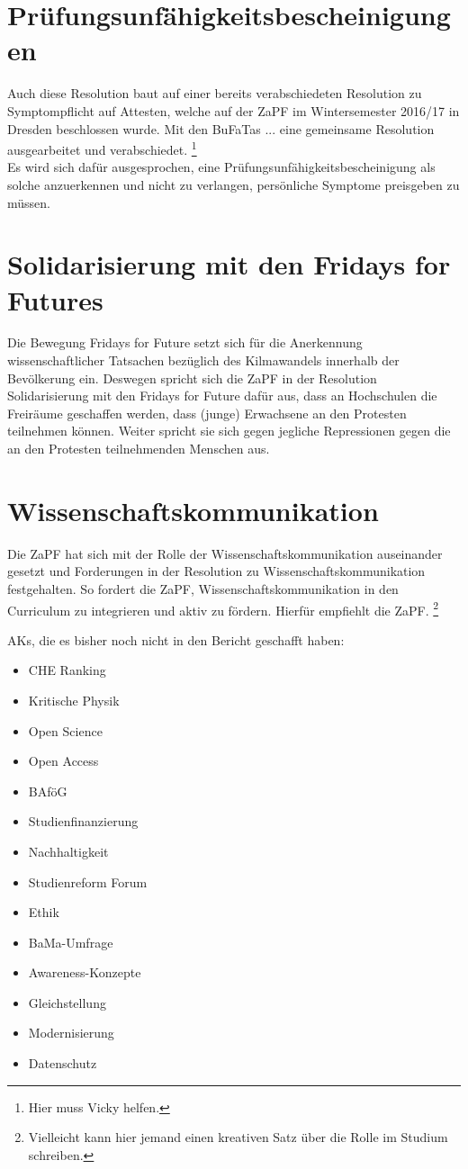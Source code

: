 \section*{Prüfungsunfähigkeitsbescheinigungen}
Auch diese Resolution baut auf einer bereits verabschiedeten Resolution zu Symptompflicht auf Attesten, welche auf der ZaPF im Wintersemester 2016/17 in Dresden beschlossen wurde. Mit den BuFaTas ... eine gemeinsame Resolution ausgearbeitet und verabschiedet. \footnote{Hier muss Vicky helfen.} \\
Es wird sich dafür ausgesprochen, eine Prüfungsunfähigkeitsbescheinigung als solche anzuerkennen und nicht zu verlangen, persönliche Symptome preisgeben zu müssen.

\section*{Solidarisierung mit den Fridays for Futures} 
Die Bewegung Fridays for Future setzt sich für die Anerkennung wissenschaftlicher Tatsachen bezüglich des Kilmawandels innerhalb der Bevölkerung ein. Deswegen spricht sich die ZaPF in der Resolution Solidarisierung mit den Fridays for Future dafür aus, dass an Hochschulen die Freiräume geschaffen werden, dass (junge) Erwachsene an den Protesten teilnehmen können. Weiter spricht sie sich gegen jegliche Repressionen gegen die an den Protesten teilnehmenden Menschen aus. 

\section*{Wissenschaftskommunikation}
Die ZaPF hat sich mit der Rolle der Wissenschaftskommunikation auseinander gesetzt und Forderungen in der Resolution zu Wissenschaftskommunikation festgehalten. So fordert die ZaPF, Wissenschaftskommunikation in den Curriculum zu integrieren und aktiv zu fördern. Hierfür empfiehlt die ZaPF. \footnote{Vielleicht kann hier jemand einen kreativen Satz über die Rolle im Studium schreiben.}

AKs, die es bisher noch nicht in den Bericht geschafft haben:
\begin{itemize}
	\item CHE Ranking
	\item Kritische Physik
	\item Open Science
	\item Open Access
	\item BAföG
	\item Studienfinanzierung
	\item Nachhaltigkeit
	\item Studienreform Forum
	\item Ethik
	\item BaMa-Umfrage
	\item Awareness-Konzepte
	\item Gleichstellung
	\item Modernisierung
	\item Datenschutz
\end{itemize}
